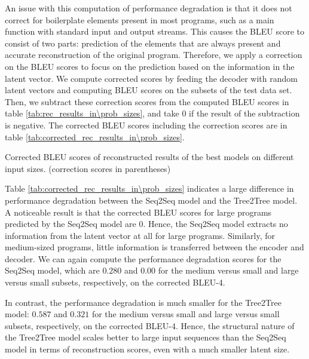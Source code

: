 An issue with this computation of performance degradation is that it does not correct for boilerplate elements present in most programs, such as a main function with standard input and output streams. 
This causes the BLEU score to consist of two parts:  prediction of the elements that are always present and accurate reconstruction of the original program. 
Therefore, we apply a correction on the BLEU scores to focus on the prediction based on the information in the latent vector. 
We compute corrected scores by feeding the decoder with random latent vectors and computing BLEU scores on the subsets of the test data set. 
Then, we subtract these correction scores from the computed BLEU scores in table \ref{tab:rec_results_in\prob_sizes}, and take 0 if the result of the subtraction is negative. The corrected BLEU scores including the correction scores are in table \ref{tab:corrected_rec_results_in\prob_sizes}.

\begin{table}
\centering

\caption{Corrected BLEU scores of reconstructed results of the best models on different input sizes. (correction scores in parentheses)}
\label{tab:corrected_rec_results_in\prob_sizes}
\end{table}



Table \ref{tab:corrected_rec_results_in\prob_sizes} indicates a large difference in performance degradation between the Seq2Seq model and the Tree2Tree model. A noticeable result is that the corrected BLEU scores for large programs predicted by the Seq2Seq model are 0. Hence, the Seq2Seq model extracts no information from the latent vector at all for large programs. Similarly, for medium-sized programs, little information is transferred between the encoder and decoder. We can again compute the performance degradation scores for the Seq2Seq model, which are $0.280$ and $0.00$ for the medium versus small and large versus small subsets, respectively, on the corrected BLEU-4.



In contrast, the performance degradation is much smaller for the Tree2Tree model:  $0.587$ and $0.321$ for the medium versus small and large versus small subsets, respectively, on the corrected BLEU-4. Hence, the structural nature of the Tree2Tree model scales better to large input sequences than the Seq2Seq model in terms of reconstruction scores, even with a much smaller latent size. 



